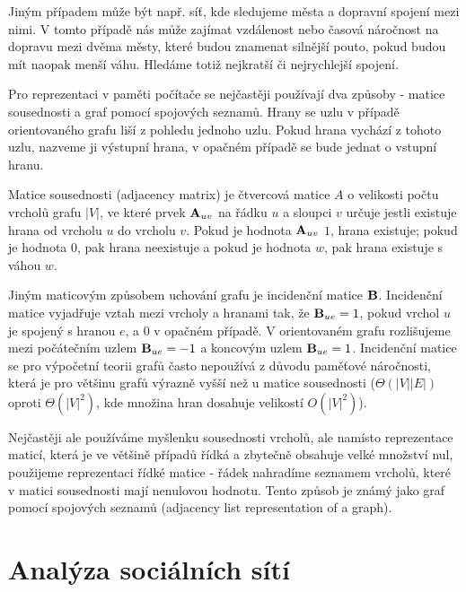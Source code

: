 \documentclass[12pt,titlepage]{report}
\begin{document}
Jiným případem může být např. síť, kde sledujeme města a dopravní spojení
mezi nimi. V tomto případě nás může zajímat vzdálenost nebo časová náročnost
na dopravu mezi dvěma městy, které budou znamenat silnější pouto, pokud budou
mít naopak menší váhu. Hledáme totiž nejkratší či nejrychlejší spojení.


Pro reprezentaci v paměti počítače se nejčastěji používají dva způsoby - matice
sousednosti a graf pomocí spojových seznamů.  Hrany se uzlu v případě
orientovaného grafu liší z pohledu jednoho uzlu. Pokud hrana vychází z tohoto
uzlu, nazveme ji výstupní hrana, v opačném případě se bude jednat o vstupní
hranu.


Matice sousednosti (adjacency matrix) je čtvercová matice $A$ o velikosti počtu
vrcholů grafu $|V|$, ve které prvek ${\bf A}_{uv}$ na řádku $u$ a sloupci $v$
určuje jestli existuje hrana od vrcholu $u$ do vrcholu $v$. Pokud je hodnota
${\bf A}_{uv}$ $1$, hrana existuje; pokud je hodnota $0$, pak hrana neexistuje
a pokud je hodnota $w$, pak hrana existuje s váhou $w$.

Jiným maticovým způsobem uchování grafu je incidenční matice ${\bf B}$.
Incidenční matice vyjadřuje vztah mezi vrcholy a hranami tak, že ${\bf B}_{ue}
= 1$, pokud vrchol $u$ je spojený s hranou $e$, a $0$ v opačném případě. V
orientovaném grafu rozlišujeme mezi počátečním uzlem ${\bf B}_{ue} = -1$ a
koncovým uzlem ${\bf B}_{ue} = 1$. Incidenční matice se pro výpočetní teorii
grafů často nepoužívá z důvodu paměťové náročnosti, která je pro většinu grafů
výrazně vyšší než u matice sousednosti ($\Theta(|V||E|)$ oproti $\Theta(|V|^2)$, kde množina hran dosahuje velikostí $O(|V|^2)$).

Nejčastěji ale používáme myšlenku sousednosti vrcholů, ale namísto reprezentace
maticí, která je ve většině případů řídká a zbytečně obsahuje velké množství
nul, použijeme reprezentaci řídké matice - řádek nahradíme seznamem vrcholů,
které v matici sousednosti mají nenulovou hodnotu. Tento způsob je známý jako
graf pomocí spojových seznamů (adjacency list representation of a graph).

\section{Analýza sociálních sítí}
\end{document}
